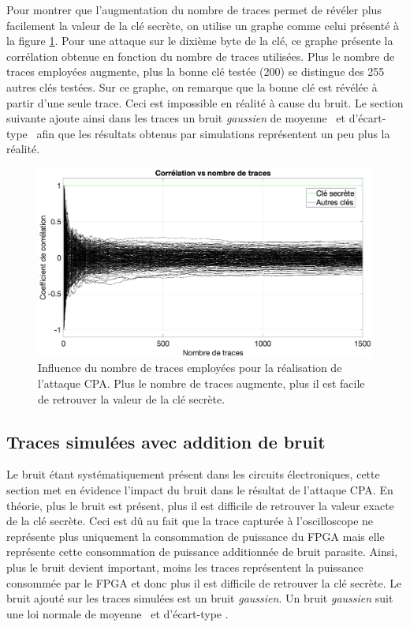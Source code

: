 \documentclass[oneside]{book}
\begin{document}
Pour montrer que l’augmentation du nombre de traces permet de révéler plus facilement la valeur de la clé secrète, on utilise un graphe comme celui présenté à la figure \ref{fig:sim_corr_fonction_nb_traces}. Pour une attaque sur le dixième byte de la clé, ce graphe présente la corrélation obtenue en fonction du nombre de traces utilisées. Plus le nombre de traces employées augmente, plus la bonne clé testée (200) se distingue des 255 autres clés testées. Sur ce graphe, on remarque que la bonne clé est révélée à partir d'une seule trace. Ceci est impossible en réalité à cause du bruit. Le section suivante ajoute ainsi dans les traces un bruit \textit{gaussien} de moyenne \mu \ et d'écart-type \sigma \ afin que les résultats obtenus par simulations représentent un peu plus la réalité.

\begin{figure}[htbp]
    \hspace{-2.5cm}
    \includegraphics[scale=0.41]{image/sim_corr_fonction_nb_traces}
    \caption{Influence du nombre de traces employées pour la réalisation de l'attaque CPA. Plus le nombre de traces augmente, plus il est facile de retrouver la valeur de la clé secrète.}
    \label{fig:sim_corr_fonction_nb_traces} 
\end{figure}

\subsection{Traces simulées avec addition de bruit}
\label{sec:sim_trace_noise}

Le bruit étant systématiquement présent dans les circuits électroniques, cette section met en évidence l'impact du bruit dans le résultat de l'attaque CPA. En théorie, plus le bruit est présent, plus il est difficile de retrouver la valeur exacte de la clé secrète. Ceci est dû au fait que la trace capturée à l'oscilloscope ne représente plus uniquement la consommation de puissance du FPGA mais elle représente cette consommation de puissance additionnée de bruit parasite. Ainsi, plus le bruit devient important, moins les traces représentent la puissance consommée par le FPGA et donc plus il est difficile de retrouver la clé secrète. Le bruit ajouté sur les traces simulées est un bruit \textit{gaussien}. Un bruit \textit{gaussien} suit une loi normale de moyenne \mu \ et d'écart-type \sigma.
\end{document}
